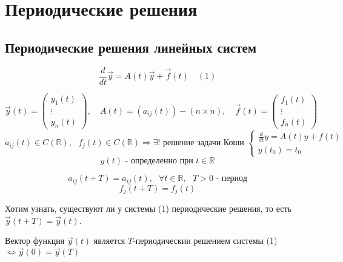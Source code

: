 \documentclass[12pt, a4paper]{report}
\begin{document}
\fi


\chapter{Периодические решения}

\section{Периодические решения линейных систем}

\[ \frac{d}{dt } \vec{y }  = A(t ) \vec{y } + \vec{f } (t ) \quad  (1) \] 

\[ \vec{y}  (t ) =\begin{pmatrix}
y_1(t)\\
\vdots\\
y_n(t)
\end{pmatrix}  ,\quad  A(t ) = ( a_{ij }(t)  ) - (n \times  n) , \quad \vec{f} (t ) =\begin{pmatrix}
    f_1(t)\\
    \vdots\\
    f_n(t)
\end{pmatrix}  \] 
\[ a_{ij } (t ) \in C(\mathbb{R}) , \text{ } f_j (t ) \in  C(\mathbb{R} ) \Rightarrow \exists ! \text{ решение задачи Коши }  \begin{cases}
\displaystyle  \frac{d}{dt }  y = A (t ) y + f(t  ) \\
y(t_0 ) = t_0 
\end{cases} \]
\[ y(t )  \text{ - определенно при } t \in  \mathbb{R}\]   

\[ a_{ij }  (t+T      ) = a_{ij }  (t ) , \text{ }  \forall  t \in  \mathbb{R} , \text{ }  T > 0 \text{ - период}  \] 
\[ f_j (t + T ) = f_j(t)  \] 

Хотим узнать, существуют ли у системы (1) периодические решения, то есть \( \vec{y } (t+ T) = \vec{y } (t ) \).

\begin{theorem}
    Вектор функция \( \vec{y } (t ) \)  является \( T \)-периодическии решением системы (1) \( \Leftrightarrow  \vec{y } (0 ) = \vec{y }  (T)  \) 
\end{theorem}
\end{document}
